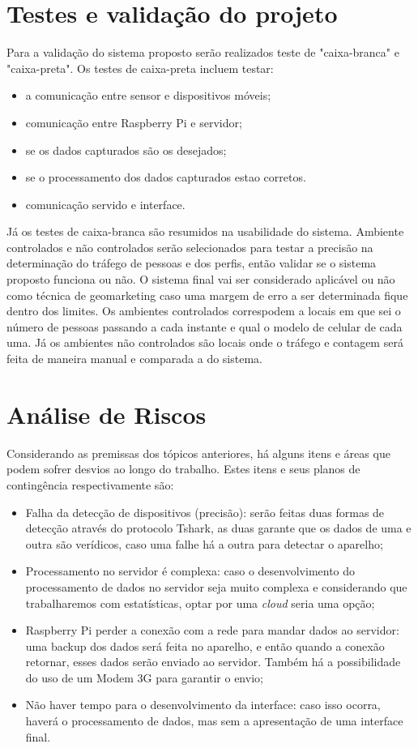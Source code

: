 \section{Testes e validação do projeto}
Para a validação do sistema proposto serão realizados teste de "caixa-branca" e "caixa-preta". Os testes de caixa-preta incluem testar:
\begin{itemize}
  \item a comunicação entre sensor e dispositivos móveis;
  \item comunicação entre Raspberry Pi e servidor;
  \item se os dados capturados são os desejados;
  \item se o processamento dos dados capturados estao corretos.
  \item comunicação servido e interface.
\end{itemize}

Já os testes de caixa-branca são resumidos na usabilidade do sistema. Ambiente controlados e não controlados serão selecionados
para testar a precisão na determinação do tráfego de pessoas e dos perfis, então validar se o sistema proposto funciona ou não.
O sistema final vai ser considerado aplicável ou não como técnica de geomarketing caso uma margem de erro a ser determinada fique dentro
dos limites. Os ambientes controlados correspodem a locais em que sei o número de pessoas passando a cada instante e qual o modelo de celular
de cada uma. Já os ambientes não controlados são locais onde o tráfego e contagem será feita de maneira manual e comparada a do sistema.

\section{Análise de Riscos}
Considerando as premissas dos tópicos anteriores, há alguns itens e áreas que podem sofrer desvios ao longo do trabalho. Estes itens e seus planos
de contingência respectivamente são:

\begin{itemize}
  \item Falha da detecção de dispositivos (precisão): serão feitas duas formas de detecção através do protocolo Tshark, as duas garante que os dados
  de uma e outra são verídicos, caso uma falhe há a outra para detectar o aparelho;
  \item Processamento no servidor é complexa: caso o desenvolvimento do processamento de dados no servidor seja muito complexa e considerando
  que trabalharemos com estatísticas, optar por uma \emph{cloud} seria uma opção;
  \item Raspberry Pi perder a conexão com a rede para mandar dados ao servidor: uma backup dos dados será feita no aparelho, e então quando
  a conexão retornar, esses dados serão enviado ao servidor. Também há a possibilidade do uso de um Modem 3G para garantir o envio;
  \item Não haver tempo para o desenvolvimento da interface: caso isso ocorra, haverá o processamento de dados, mas sem a apresentação de uma interface final.
\end{itemize}
